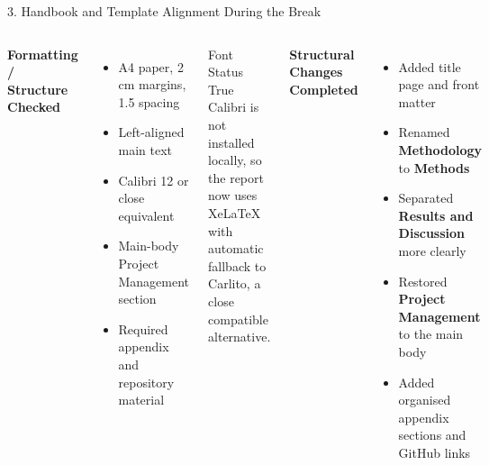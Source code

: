 \documentclass[aspectratio=169, 11pt]{beamer}
\begin{document}
\begin{frame}[shrink=7]{3. Handbook and Template Alignment During the Break}

    \begin{columns}[T]
        \textbf{Formatting / Structure Checked}
        \begin{itemize}
            \item A4 paper, 2\,cm margins, 1.5 spacing
            \item Left-aligned main text
            \item Calibri 12 or close equivalent
            \item Main-body Project Management section
            \item Required appendix and repository material
        \end{itemize}

        \vspace{2mm}
        \begin{exampleblock}{Font Status}
            True Calibri is not installed locally, so the report now uses XeLaTeX with automatic fallback to Carlito, a close compatible alternative.
        \end{exampleblock}

        \textbf{Structural Changes Completed}
        \begin{itemize}
            \item Added title page and front matter
            \item Renamed \textbf{Methodology} to \textbf{Methods}
            \item Separated \textbf{Results and Discussion} more clearly
            \item Restored \textbf{Project Management} to the main body
            \item Added organised appendix sections and GitHub links
        \end{itemize}
    \end{columns}
\end{frame}
\end{document}
